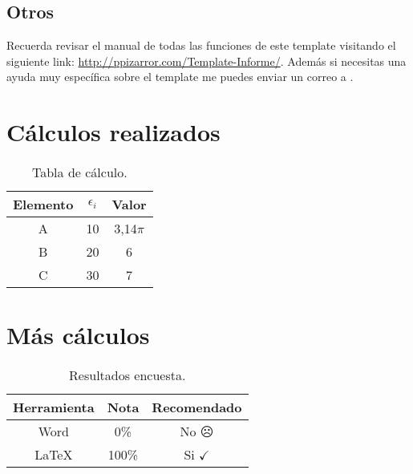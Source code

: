 	\subsection{Otros}
		
		Recuerda revisar el manual de todas las funciones de este template visitando el siguiente link: \url{http://ppizarror.com/Template-Informe/}. Además si necesitas una ayuda muy específica sobre el template me puedes enviar un correo a .

\newpage
\begin{anexo}
	\section{Cálculos realizados}
	
		\lipsum[69]
		
		
		\lipsum[10]
		
		\begin{table}[htbp]
			\centering
			\caption{Tabla de cálculo.}
			\begin{tabular}{ccc}
				\hline
				\textbf{Elemento} & $\epsilon_i$ & \boldmath{}\textbf{Valor}\unboldmath{} \bigstrut\\
				\hline
				A     & 10    & 3,14$\pi$ \bigstrut[t]\\
				B     & 20    & 6 \\
				C     & 30    & 7 \\
				\end{tabular}
			\label{tab:anexo-1}
		\end{table}
	
	\newpage
	\section{Más cálculos}
	
		\lipsum[1]\newp\lipsum[4]
		
		\begin{table}[htbp]
			\centering
			\caption{Resultados encuesta.}
			\begin{tabular}{ccc}
				\hline
				\textbf{Herramienta} & \textbf{Nota} & \textbf{Recomendado} \bigstrut\\
				\hline
				Word  & 0\%   & No $\frownie$\\
				\LaTeX & 100\% & Si $\checkmark$ \\
			\end{tabular}
			\label{tab:anexo-2}
		\end{table}
		
\end{anexo}

